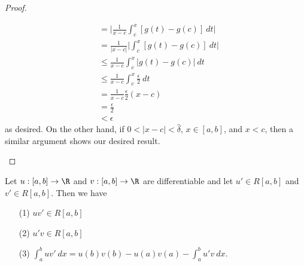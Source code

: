 \begin{proof}
\begin{enumerate}
\begin{enumerate}
\begin{align*}
                        &= \Big| \frac{ 1 }{ x - c  } \int_{ c  }^{  x  } [g(t) - g(c)] \ dt  \Big| \\
                        &= \frac{ 1 }{ | x - c  |  }  \Big| \int_{ c }^{ x }  [g(t) - g(c)] \ dt   \Big|  \\
                        &\leq \frac{ 1 }{ x - c  }  \int_{ c }^{ x }  | g(t) - g(c) |  \ dt \\
                        &\leq \frac{ 1 }{ x - c  }  \int_{ c }^{ x }  \frac{ \epsilon }{ 2 }   \ dt \\
                        &= \frac{ 1 }{ x - c  }  \frac{ \epsilon }{ 2 }  (x - c ) \\
                        &= \frac{ \epsilon }{ 2 }  \\
                        &< \epsilon
                    \end{align*}
                    as desired. On the other hand, if \( 0 < | x - c  |  < \hat{\delta} \), \( x \in [a,b] \), and \( x < c  \), then a similar argument shows our desired result.

            \end{enumerate}
    \end{enumerate}

    \end{proof}

\begin{theorem}
    Let \( u : [a,b] \to \R  \) and \( v : [a,b] \to \R  \) are differentiable and let \( u' \in R[a,b] \) and \( v' \in R[a,b] \). Then we have  
    \begin{enumerate}
        \item[(1)] \( uv' \in R [a,b] \)
        \item[(2)] \( u' v \in R[a,b] \)
        \item[(3)] \( \displaystyle  \int_{ a }^{ b }  uv'  \ dx = u(b)v(b) - u(a) v(a) - \displaystyle \int_{ a }^{ b } u' v  \ dx  \).
    \end{enumerate}
\end{theorem}


